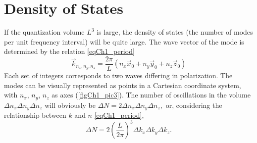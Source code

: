 \section{Density of States}
If the quantization volume $L^3$ is large, the density of states (the number of modes per unit frequency interval) will be quite large. The wave vector of the mode is determined by the relation \eqref{eqCh1_period}
\begin{equation}
\vec{k}_{n_x, n_y, n_z} = \frac{2 \pi}{L}\left(n_x \vec{x}_0
+ n_y \vec{y}_0
+ n_z \vec{z}_0
\right)
\end{equation}
Each set of integers corresponds to two waves differing in polarization. The modes can be visually represented as points in a Cartesian coordinate system, with $n_x$, $n_y$, $n_z$ as axes (\autoref{figCh1_pic3}). The number of oscillations in the volume  
\(
\Delta n_x \Delta n_y \Delta n_z
\)
will obviously be  
\(
\Delta N = 2 \Delta n_x \Delta n_y \Delta n_z,
\)
or, considering the relationship  
between $k$ and $n$ \eqref{eqCh1_period},
\begin{equation}
\Delta N = 2 \left(\frac{L}{2 \pi} \right)^3 \Delta k_x \Delta k_y \Delta k_z.
\label{eqCh1_modenumber}
\end{equation}





